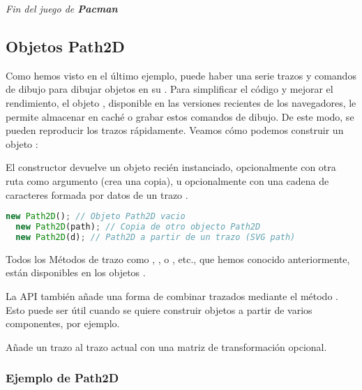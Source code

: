\hfill \textit{Fin del juego de \textbf{Pacman}}

\vspace{10mm}
\subsection{Objetos Path2D}
Como hemos visto en el último ejemplo, puede haber una serie trazos y comandos de dibujo para dibujar objetos en su . Para simplificar el código y mejorar el rendimiento, el objeto , disponible en las versiones recientes de los navegadores, le permite almacenar en caché o grabar estos comandos de dibujo. De este modo, se pueden reproducir los trazos rápidamente. Veamos cómo podemos construir un objeto :

\begin{description}
	 El constructor  devuelve un objeto  recién instanciado, opcionalmente con otra ruta como argumento (crea una copia), u opcionalmente con una cadena de caracteres formada por datos de un trazo .
\end{description}
\vspace{0.5cm} %

\begin{lstlisting}[language=TypeScript, style=mystyle]
  new Path2D(); // Objeto Path2D vacio
  new Path2D(path); // Copia de otro objecto Path2D
  new Path2D(d); // Path2D a partir de un trazo (SVG path)
\end{lstlisting}
\vspace{0.5cm} %

Todos los Métodos de trazo como , ,  o , etc., que hemos conocido anteriormente, están disponibles en los objetos .

La API  también añade una forma de combinar trazados mediante el método . Esto puede ser útil cuando se quiere construir objetos a partir de varios componentes, por ejemplo.

\begin{description}
	 Añade un trazo al trazo actual con una matriz de transformación opcional.
\end{description}

\newpage %
\subsubsection{Ejemplo de Path2D}

